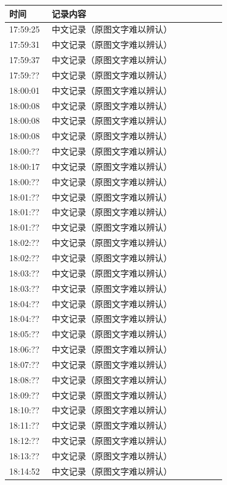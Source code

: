 \documentclass[UTF8,10pt,a4paper,fontset=fandol]{ctexart}
\begin{document}
\begin{center}
\vspace{1em}

\begin{tabular}{p{0.18\linewidth}p{0.74\linewidth}}
\textbf{时间} & \textbf{记录内容} \\ \hline
17:59:25 & 中文记录（原图文字难以辨认）\\
17:59:31 & 中文记录（原图文字难以辨认）\\
17:59:37 & 中文记录（原图文字难以辨认）\\
17:59:?? & 中文记录（原图文字难以辨认）\\
18:00:01 & 中文记录（原图文字难以辨认）\\
18:00:08 & 中文记录（原图文字难以辨认）\\
18:00:08 & 中文记录（原图文字难以辨认）\\
18:00:08 & 中文记录（原图文字难以辨认）\\
18:00:?? & 中文记录（原图文字难以辨认）\\
18:00:17 & 中文记录（原图文字难以辨认）\\
18:00:?? & 中文记录（原图文字难以辨认）\\
18:01:?? & 中文记录（原图文字难以辨认）\\
18:01:?? & 中文记录（原图文字难以辨认）\\
18:01:?? & 中文记录（原图文字难以辨认）\\
18:02:?? & 中文记录（原图文字难以辨认）\\
18:02:?? & 中文记录（原图文字难以辨认）\\
18:03:?? & 中文记录（原图文字难以辨认）\\
18:03:?? & 中文记录（原图文字难以辨认）\\
18:04:?? & 中文记录（原图文字难以辨认）\\
18:04:?? & 中文记录（原图文字难以辨认）\\
18:05:?? & 中文记录（原图文字难以辨认）\\
18:06:?? & 中文记录（原图文字难以辨认）\\
18:07:?? & 中文记录（原图文字难以辨认）\\
18:08:?? & 中文记录（原图文字难以辨认）\\
18:09:?? & 中文记录（原图文字难以辨认）\\
18:10:?? & 中文记录（原图文字难以辨认）\\
18:11:?? & 中文记录（原图文字难以辨认）\\
18:12:?? & 中文记录（原图文字难以辨认）\\
18:13:?? & 中文记录（原图文字难以辨认）\\
18:14:52 & 中文记录（原图文字难以辨认）\\ \hline
\end{tabular}
\end{center}
\end{document}
